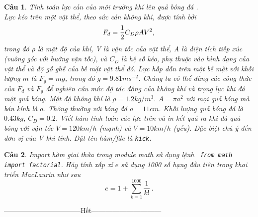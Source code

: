 \documentclass[answers]{exam}
\newtheorem{bt}{Câu}
\begin{document}
\begin{bt} Tính toán lực cản của môi trường khí lên quả bóng đá . \\
Lực kéo trên một vật thể, theo sức cản không khí, được tính bởi  
%
\[
F_d = \dfrac{1}{2} C_D \rho A V^2, \\
\]
%
trong đó $\rho$ là mật độ của khí, V là vận tốc của vật thể, A là diện tích tiếp xúc 
(vuông góc với hướng vận tốc), và $C_D$ là hệ số kéo, phụ thuộc vào hình dạng của vật thể và độ gồ ghề của bề mặt vật thể đó. 
Lực hấp dẫn trên một bề mặt với khối lượng $m$ là $F_g = mg$, trong đó $g = 9.81m s^{-2}$.
Chúng ta có thể dùng các công thức của $F_d$ và $F_g$ để nghiên cứu mức độ tác động của không khí và trọng lực khi đá một quả bóng. 
Mật độ không khí là $\rho = 1.2 kg/m^3$. 
$A = \pi a^2$ với mọi quả bóng mà bán kính là $a$. Thông thường với bóng đá $a = 11 cm$. 
Khối lượng quả bóng đá là $0.43 kg$, $C_D= 0.2$. 
Viết hàm tính toán các lực trên và in kết quả ra khi đá quả bóng với vận tốc $V = 120 km/h$ (mạnh) và $V = 10 km/h$ (yếu).
Đặc biệt chú ý đến đơn vị của V khi tính. Đặt tên hàm/file là \verb|kick|.
\end{bt}

\begin{bt}
Import hàm giai thừa trong module math sử dụng lệnh \verb| from math import factorial|. Hãy tính xấp xỉ $e$ sử dụng 1000 số hạng đầu tiên trong khai triển MacLaurin như sau
%
\[
e = 1 + \sum_{k=1}^{1000} \dfrac{1}{k!} \ .
\]
%
\end{bt}
\centerline{———————————Hết——————————}

% 
   
\end{document}
